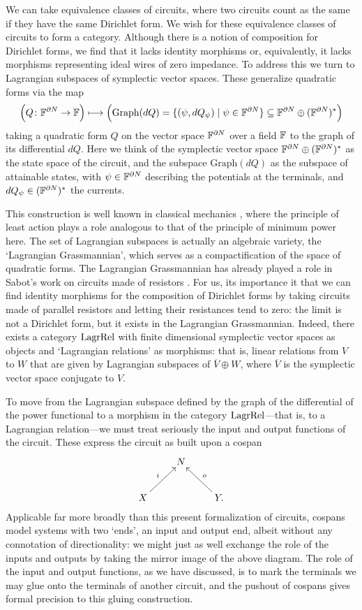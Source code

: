 We can take equivalence classes of circuits, where two circuits count as the
same if they have the same Dirichlet form.  We wish for these equivalence classes of circuits to form a category. Although
there is a notion of composition for Dirichlet forms, we find that it lacks
identity morphisms or, equivalently, it lacks morphisms representing ideal wires
of zero impedance. To address this we turn to Lagrangian subspaces of
symplectic vector spaces.  These generalize quadratic forms via the map
\[
  \Big(Q{\colon} {\mathbb F}^{\partial N} \to {\mathbb F}\Big) \longmapsto \Big(\mathrm{Graph}(dQ) =
  \{(\psi, dQ_\psi) \mid \psi \in {\mathbb F}^{\partial N} \} \subseteq {\mathbb F}^{\partial
  N} \oplus ({\mathbb F}^{\partial N})^\ast\Big)
\]
taking a quadratic form $Q$ on the vector space ${\mathbb F}^{\partial N}$
over a field ${\mathbb F}$ to the graph of its differential $dQ$. Here we think of the
symplectic vector space ${\mathbb F}^{\partial N} \oplus ({\mathbb F}^{\partial N})^\ast$ as the
state space of the circuit, and the subspace $\mathrm{Graph}(dQ)$ as the
subspace of attainable states, with $\psi \in {\mathbb F}^{\partial N}$ describing the
potentials at the terminals, and $dQ_\psi \in ({\mathbb F}^{\partial N})^\ast$ the
currents. 

This construction is well known in classical mechanics \cite{Weinstein}, where the principle of least action plays a role analogous to that of the principle of minimum power here.   The set of Lagrangian subspaces is actually an algebraic variety,
the `Lagrangian Grassmannian', which serves as a compactification of the
space of quadratic forms.  The Lagrangian Grassmannian has already played a
role in Sabot's work on circuits made of resistors \cite{Sabot1997,Sabot2004}.
For us, its importance it that we can find identity morphisms
for the composition of Dirichlet forms by taking circuits made of parallel resistors
and letting their resistances tend to zero: the limit is not a Dirichlet form, but
it exists in the Lagrangian Grassmannian.    Indeed, 
there exists a category $\mathrm{LagrRel}$ with finite dimensional
symplectic vector spaces as objects and `Lagrangian relations' as morphisms: 
that is, linear relations from $V$ to $W$ that are given by Lagrangian subspaces of $\overline{V} \oplus W$, where $\overline{V}$ is the symplectic vector space conjugate to $V$.   

To move from the Lagrangian subspace defined by the graph of the differential of
the power functional to a morphism in the category $\mathrm{LagrRel}$---that
is, to a Lagrangian relation---we must treat seriously the input and output
functions of the circuit. These express the circuit as built upon a cospan   
\[
  \xymatrix{
    & N \\
    X \ar[ur]^{i} && Y. \ar[ul]_o
  }
\]
Applicable far more broadly than this present formalization of circuits, cospans
model systems with two `ends', an input and output end, albeit without any
connotation of directionality: we might just as well exchange the role of the
inputs and outputs by taking the mirror image of the above diagram. The role of
the input and output functions, as we have discussed, is to mark the terminals
we may glue onto the terminals of another circuit, and the pushout of cospans
gives formal precision to this gluing construction.

